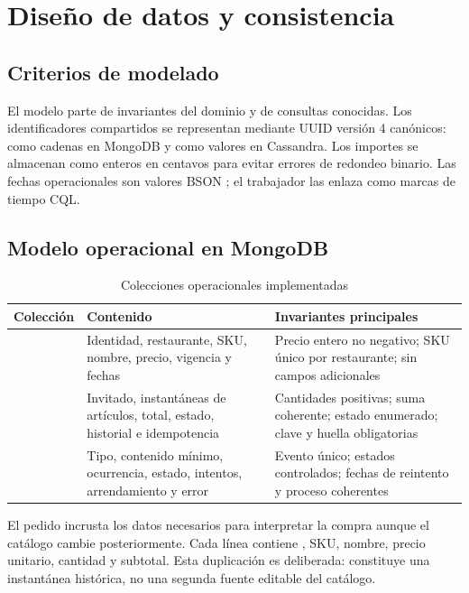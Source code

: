 \chapter{Diseño de datos y consistencia}
\label{chap:datos}

\section{Criterios de modelado}

El modelo parte de invariantes del dominio y de consultas conocidas. Los identificadores compartidos se representan mediante UUID versión 4 canónicos: como cadenas en MongoDB y como valores  en Cassandra. Los importes se almacenan como enteros en centavos para evitar errores de redondeo binario. Las fechas operacionales son valores BSON ; el trabajador las enlaza como marcas de tiempo CQL.

\section{Modelo operacional en MongoDB}

\begin{table}[H]
  \centering
  \caption{Colecciones operacionales implementadas}
  \label{tab:colecciones}
  \begin{tabularx}{\textwidth}{@{}p{2.7cm}YY@{}}
    \toprule
    \textbf{Colección} & \textbf{Contenido} & \textbf{Invariantes principales} \\
    \midrule
     & Identidad, restaurante, SKU, nombre, precio, vigencia y fechas & Precio entero no negativo; SKU único por restaurante; sin campos adicionales \\
     & Invitado, instantáneas de artículos, total, estado, historial e idempotencia & Cantidades positivas; suma coherente; estado enumerado; clave y huella obligatorias \\
     & Tipo, contenido mínimo, ocurrencia, estado, intentos, arrendamiento y error & Evento único; estados controlados; fechas de reintento y proceso coherentes \\
    \bottomrule
  \end{tabularx}
\end{table}

El pedido incrusta los datos necesarios para interpretar la compra aunque el catálogo cambie posteriormente. Cada línea contiene , SKU, nombre, precio unitario, cantidad y subtotal. Esta duplicación es deliberada: constituye una instantánea histórica, no una segunda fuente editable del catálogo.

